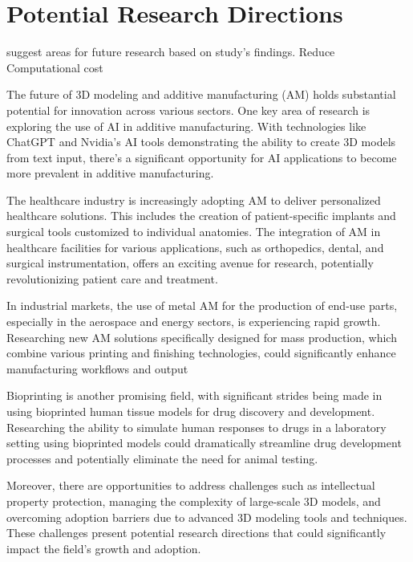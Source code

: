 \section{Potential Research Directions}
suggest areas for future research based on study's findings.
Reduce Computational cost

The future of 3D modeling and additive manufacturing (AM) holds substantial potential for innovation across various sectors. One key area of research is exploring the use of AI in additive manufacturing. With technologies like ChatGPT and Nvidia's AI tools demonstrating the ability to create 3D models from text input, there's a significant opportunity for AI applications to become more prevalent in additive manufacturing.

The healthcare industry is increasingly adopting AM to deliver personalized healthcare solutions. This includes the creation of patient-specific implants and surgical tools customized to individual anatomies. The integration of AM in healthcare facilities for various applications, such as orthopedics, dental, and surgical instrumentation, offers an exciting avenue for research, potentially revolutionizing patient care and treatment.

In industrial markets, the use of metal AM for the production of end-use parts, especially in the aerospace and energy sectors, is experiencing rapid growth. Researching new AM solutions specifically designed for mass production, which combine various printing and finishing technologies, could significantly enhance manufacturing workflows and output

Bioprinting is another promising field, with significant strides being made in using bioprinted human tissue models for drug discovery and development. Researching the ability to simulate human responses to drugs in a laboratory setting using bioprinted models could dramatically streamline drug development processes and potentially eliminate the need for animal testing.

Moreover, there are opportunities to address challenges such as intellectual property protection, managing the complexity of large-scale 3D models, and overcoming adoption barriers due to advanced 3D modeling tools and techniques. These challenges present potential research directions that could significantly impact the field's growth and adoption.

